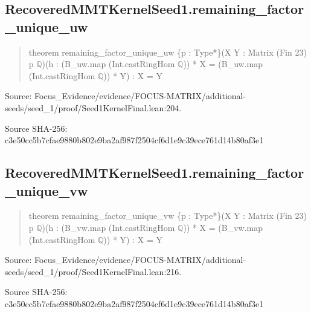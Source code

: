 \documentclass[11pt,a4paper]{article}
\begin{document}
\begin{samepage}
\subsection{RecoveredMMTKernelSeed1.remaining\_factor\_unique\_uw}
\begin{quote}\small\ttfamily theorem remaining\_factor\_unique\_uw \{p : Type*\}\newline     (X Y : Matrix (Fin 23) p \ensuremath{\mathbb{Q}})\newline     (h : (B\_uw.map (Int.castRingHom \ensuremath{\mathbb{Q}})) * X = (B\_uw.map (Int.castRingHom \ensuremath{\mathbb{Q}})) * Y) : X = Y\end{quote}
{\small Source: Focus\_Evidence/evidence/FOCUS-MATRIX/additional-seeds/seed\_1/proof/Seed1KernelFinal.lean:204.\par}

{\small Source SHA-256: c3e50cc5b7cfae9880b802e9ba2af987f2504cf6d1e9c39ece761d14b80af3e1\par}

\end{samepage}
\begin{samepage}
\subsection{RecoveredMMTKernelSeed1.remaining\_factor\_unique\_vw}
\begin{quote}\small\ttfamily theorem remaining\_factor\_unique\_vw \{p : Type*\}\newline     (X Y : Matrix (Fin 23) p \ensuremath{\mathbb{Q}})\newline     (h : (B\_vw.map (Int.castRingHom \ensuremath{\mathbb{Q}})) * X = (B\_vw.map (Int.castRingHom \ensuremath{\mathbb{Q}})) * Y) : X = Y\end{quote}
{\small Source: Focus\_Evidence/evidence/FOCUS-MATRIX/additional-seeds/seed\_1/proof/Seed1KernelFinal.lean:216.\par}

{\small Source SHA-256: c3e50cc5b7cfae9880b802e9ba2af987f2504cf6d1e9c39ece761d14b80af3e1\par}

\end{samepage}
\end{document}
